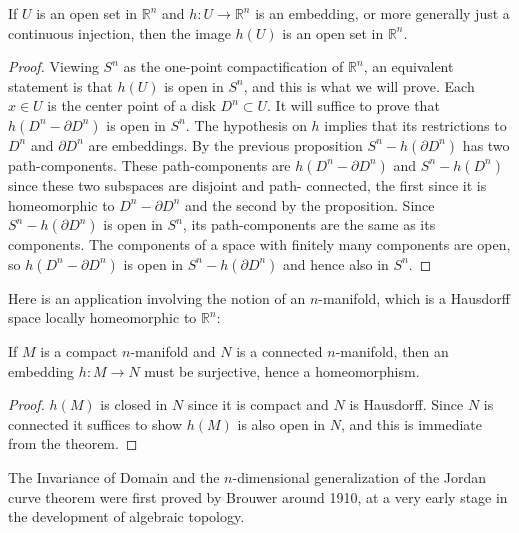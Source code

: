 \begin{theorem}
\label{thm:invariance-of-domain-general}
If $U$ is an open set in $\mathbb{R}^n$ and $h:U \to \mathbb{R}^n$ is an embedding, or more
generally just a continuous injection, then the image $h(U)$ is an open set in $\mathbb{R}^n$.
\end{theorem}
\begin{proof}
 Viewing $S^n$ as the one-point compactification of $\mathbb{R}^n$, an equivalent statement
is that $h(U)$ is open in $S^n$, and this is what we will prove. Each $x \in U$ is the center
point of a disk $D^n \subset U$. It will suffice to prove that $h(D^n - \partial D^n)$ is open in $S^n$. The
hypothesis on $h$ implies that its restrictions to $D^n$ and $\partial D^n$ are embeddings. By the
previous proposition $S^n - h(\partial D^n)$ has two path-components. These path-components
are $h(D^n - \partial D^n)$ and $S^n - h(D^n)$ since these two subspaces are disjoint and path-
connected, the first since it is homeomorphic to $D^n - \partial D^n$ and the second by the
proposition. Since $S^n - h(\partial D^n)$ is open in $S^n$, its path-components are the same as
its components. The components of a space with finitely many components are open,
so $h(D^n - \partial D^n)$ is open in $S^n - h(\partial D^n)$ and hence also in $S^n$.
\end{proof}
Here is an application involving the notion of an $n$-manifold, which is a Hausdorff
space locally homeomorphic to $\mathbb{R}^n$:

\begin{corollary}
\label{cor:embedding-compact-manifold-connected}
If $M$ is a compact $n$-manifold and $N$ is a connected $n$-manifold,
then an embedding $h:M \to N$ must be surjective, hence a homeomorphism.
\end{corollary}
\begin{proof}
 $h(M)$ is closed in $N$ since it is compact and $N$ is Hausdorff. Since $N$ is
connected it suffices to show $h(M)$ is also open in $N$, and this is immediate from the
theorem.
\end{proof}
The Invariance of Domain and the $n$-dimensional generalization of the Jordan curve theorem were first proved by Brouwer around 1910, at a very early stage in the development of algebraic topology.

